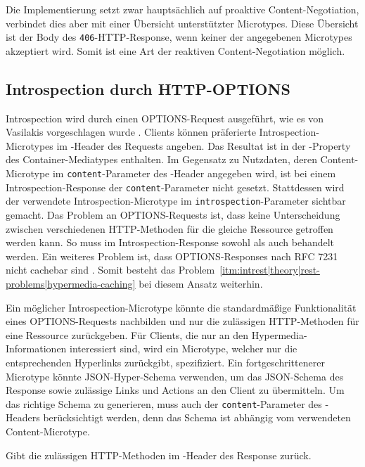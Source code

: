 Die Implementierung setzt zwar hauptsächlich auf proaktive Content-Negotiation, verbindet dies aber mit einer Übersicht unterstützter Microtypes. Diese Übersicht ist der Body des \texttt{406}-HTTP-Response, wenn keiner der angegebenen Microtypes akzeptiert wird. Somit ist eine Art der reaktiven Content-Negotiation möglich.

\subsection{Introspection durch HTTP-OPTIONS}\label{subsec:intrest|prototype|introspection}
Introspection wird durch einen OPTIONS-Request ausgeführt, wie es von Vasilakis vorgeschlagen wurde \autocite[Abs.~10.4.1]{Vasilakis2017}. Clients können präferierte Introspection-Microtypes im -Header des Requests angeben. Das Resultat ist in der -Property des Container-Mediatypes enthalten. Im Gegensatz zu Nutzdaten, deren Content-Microtype im \texttt{content}-Parameter des -Header angegeben wird, ist bei einem Introspection-Response der \texttt{content}-Parameter nicht gesetzt. Stattdessen wird der verwendete Introspection-Microtype im \texttt{introspection}-Parameter sichtbar gemacht. Das Problem an OPTIONS-Requests ist, dass keine Unterscheidung zwischen verschiedenen HTTP-Methoden für die gleiche Ressource getroffen werden kann. So muss im Introspection-Response sowohl  als auch  behandelt werden. Ein weiteres Problem ist, dass OPTIONS-Responses nach RFC 7231 nicht cachebar sind \autocite[Abs.~4.3.7]{RFC7231}. Somit besteht das Problem~\ref{itm:intrest|theory|rest-problems|hypermedia-caching} bei diesem Ansatz weiterhin.

Ein möglicher Introspection-Microtype könnte die standardmäßige Funktionalität eines OPTIONS-Requests nachbilden und nur die zulässigen HTTP-Methoden für eine Ressource zurückgeben. Für Clients, die nur an den Hypermedia-Informationen interessiert sind, wird ein Microtype, welcher nur die entsprechenden Hyperlinks zurückgibt, spezifiziert. Ein fortgeschrittenerer Microtype könnte JSON-Hyper-Schema verwenden, um das JSON-Schema des Response sowie zulässige Links und Actions an den Client zu übermitteln. Um das richtige Schema zu generieren, muss auch der \texttt{content}-Parameter des -Headers berücksichtigt werden, denn das Schema ist abhängig vom verwendeten Content-Microtype.

\begin{microtypedef}
    Gibt die zulässigen HTTP-Methoden im -Header des Response zurück.
\end{microtypedef}

